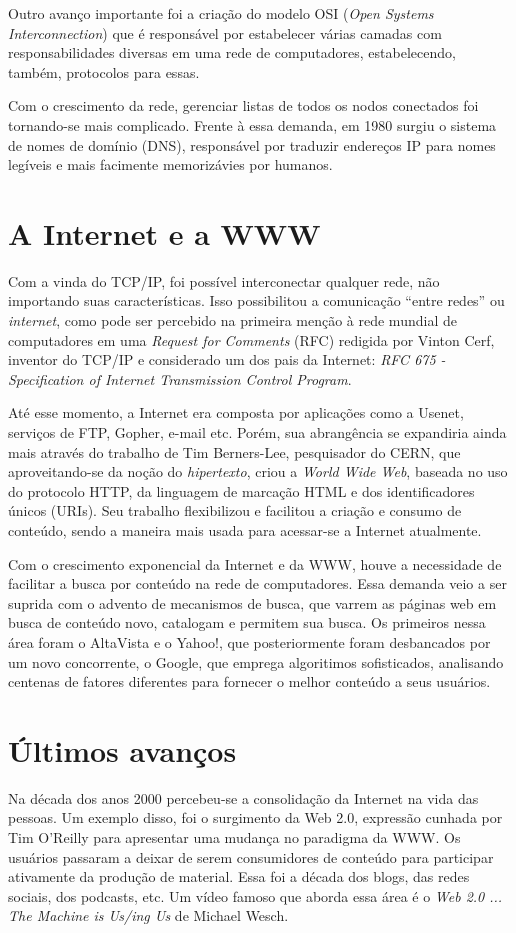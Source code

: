 \documentclass[brazil,times]{abnt}
\begin{document}
Outro avanço importante foi a criação do modelo OSI (\emph{Open Systems
Interconnection}) que é responsável por estabelecer várias camadas com
responsabilidades diversas em uma rede de computadores, estabelecendo, também,
protocolos para essas.

Com o crescimento da rede, gerenciar listas de todos os nodos conectados
foi tornando-se mais complicado. Frente à essa demanda, em 1980
\cite{historia-redes-gdh} surgiu o sistema de nomes de domínio (DNS),
responsável por traduzir endereços IP para nomes legíveis e mais facimente
memorizávies por humanos.

\section{A Internet e a WWW}
Com a vinda do TCP/IP, foi possível interconectar qualquer rede, não importando
suas características. Isso possibilitou a comunicação ``entre redes'' ou
\emph{internet}, como pode ser percebido na primeira menção à rede mundial de
computadores em uma \emph{Request for Comments} (RFC) redigida por Vinton Cerf,
inventor do TCP/IP e considerado um dos pais da Internet: \emph{RFC 675 -
Specification of Internet Transmission Control Program}. \cite{wiki:history-internet}

Até esse momento, a Internet era composta por aplicações como a Usenet, serviços
de FTP, Gopher, e-mail etc. Porém, sua abrangência se expandiria ainda mais
através do trabalho de Tim Berners-Lee, pesquisador do CERN, que aproveitando-se
da noção do \emph{hipertexto}, criou a \emph{World Wide Web}, baseada no uso do
protocolo HTTP, da linguagem de marcação HTML e dos identificadores únicos
(URIs). Seu trabalho flexibilizou e facilitou a criação e consumo de conteúdo,
sendo a maneira mais usada para acessar-se a Internet atualmente.

Com o crescimento exponencial da Internet e da WWW, houve a necessidade de
facilitar a busca por conteúdo na rede de computadores. Essa demanda veio a ser
suprida com o advento de mecanismos de busca, que varrem as páginas web em busca
de conteúdo novo, catalogam e permitem sua busca. Os primeiros nessa área
foram o AltaVista e o Yahoo!, que posteriormente foram desbancados por um novo
concorrente, o Google, que emprega algoritimos sofisticados, analisando centenas
de fatores diferentes para fornecer o melhor conteúdo a seus usuários.

\section{Últimos avanços}
Na década dos anos 2000 percebeu-se a consolidação da Internet na vida das
pessoas. Um exemplo disso, foi o surgimento da Web 2.0, expressão cunhada por
Tim O'Reilly para apresentar uma mudança no paradigma da WWW. Os usuários
passaram a deixar de serem consumidores de conteúdo para participar ativamente
da produção de material. Essa foi a década dos blogs, das redes sociais, dos
podcasts, etc. Um vídeo famoso que aborda essa área é o \emph{Web 2.0 ... The Machine
is Us/ing Us } de Michael Wesch. \cite{web20-the-machine-is-us}
\end{document}
